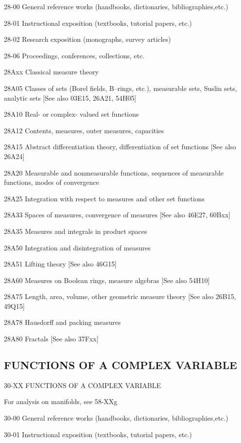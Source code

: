 \documentclass[12pt]{article}
\theoremstyle{plain}
\theoremstyle{definition}
\numberwithin{equation}{section}
\begin{document}
{{28-00 General reference works (handbooks, dictionaries, bibliographies,etc.)

28-01 Instructional exposition (textbooks, tutorial papers, etc.)

28-02 Research exposition (monographs, survey articles)

28-06 Proceedings, conferences, collections, etc.

28Axx Classical measure theory

28A05 Classes of sets (Borel fields, B--rings, etc.), measurable sets, Suslin sets, analytic sets [See also 03E15, 26A21, 54H05]

28A10 Real- or complex- valued set functions

28A12 Contents, measures, outer measures, capacities

28A15 Abstract differentiation theory, differentiation of set functions [See also 26A24]

28A20 Measurable and nonmeasurable functions, sequences of measurable functions, modes of convergence

28A25 Integration with respect to measures and other set functions

28A33 Spaces of measures, convergence of measures [See also 46E27, 60Bxx]

28A35 Measures and integrals in product spaces

28A50 Integration and disintegration of measures

28A51 Lifting theory [See also 46G15]

28A60 Measures on Boolean rings, measure algebras [See also 54H10]

28A75 Length, area, volume, other geometric measure theory [See also 26B15, 49Q15]

28A78 Hausdorff and packing measures

28A80 Fractals [See also 37Fxx]

\subsection{FUNCTIONS OF A COMPLEX VARIABLE}

30-XX FUNCTIONS OF A COMPLEX VARIABLE 

For analysis on manifolds, see 58-XXg

30-00 General reference works (handbooks, dictionaries, bibliographies,etc.)

30-01 Instructional exposition (textbooks, tutorial papers, etc.)

}}
\end{document}
